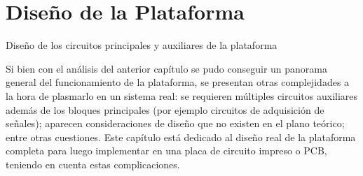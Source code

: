 \section{Diseño de la Plataforma} \label{diseño}
\thispagestyle{plain}

\vspace{0.5cm}

\Large\scshape
\begin{center}
    \textrm{Diseño de los circuitos principales y auxiliares de la plataforma}
\end{center}
\normalfont

\divider

Si bien con el análisis del anterior capítulo se pudo conseguir un panorama general del funcionamiento de la plataforma, se presentan otras complejidades a la hora de plasmarlo en un sistema real: se requieren múltiples circuitos auxiliares además de los bloques principales (por ejemplo circuitos de adquisición de señales); aparecen consideraciones de diseño que no existen en el plano teórico; entre otras cuestiones. Este capítulo está dedicado al diseño real de la plataforma completa para luego implementar en una placa de circuito impreso o PCB, teniendo en cuenta estas complicaciones.\\

